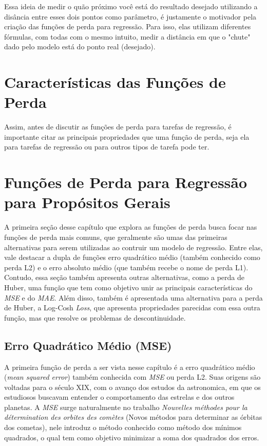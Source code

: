 Essa ideia de medir o quão próximo você está do resultado desejado utilizando a disância entre esses dois pontos como parâmetro, é justamente o motivador pela criação das funções de perda para regressão. Para isso, elas utilizam diferentes fórmulas, com todas com o mesmo intuito, medir a distância em que o "chute" dado pelo modelo está do ponto real (desejado).

\section{Características das Funções de Perda}

Assim, antes de discutir as funções de perda para tarefas de regressão, é importante citar as principais propriedades que uma função de perda, seja ela para tarefas de regressão ou para outros tipos de tarefa pode ter.

\section{Funções de Perda para Regressão para Propósitos Gerais}

A primeira seção desse capítulo que explora as funções de perda busca focar nas funções de perda mais comuns, que geralmente são umas das primeiras alternativas para serem utilizadas ao contruir um modelo de regressão. Entre elas, vale destacar a dupla de funções erro quadrático médio (também conhecido como perda L2) e o erro absoluto médio (que também recebe o nome de perda L1). Contudo, essa seção também apresenta outras alternativas, como a perda de Huber, uma função que tem como objetivo unir as principais características do \textit{MSE} e do \textit{MAE}. Além disso, também é apresentada uma alternativa para a perda de Huber, a Log-Cosh \textit{Loss}, que apresenta propriedades parecidas com essa outra função, mas que resolve os problemas de descontinuidade.

\subsection{Erro Quadrático Médio (MSE)}

A primeira função de perda a ser vista nesse capítulo é a erro quadrático médio (\textit{mean squared error}) também conhecida com \textit{MSE} ou perda L2. Suas origens são voltadas para o século XIX, com o avanço dos estudos da astronomica, em que os estudiosos buscavam entender o comportamento das estrelas e dos outros planetas. A \textit{MSE} surge naturalmente no trabalho \textit{Nouvelles méthodes pour la détermination des orbites des comètes} (Novos métodos para determinar as órbitas dos cometas), nele \textcite{Legendre1805} introduz o método conhecido como método dos mínimos quadrados, o qual tem como objetivo minimizar a soma dos quadrados dos erros.

